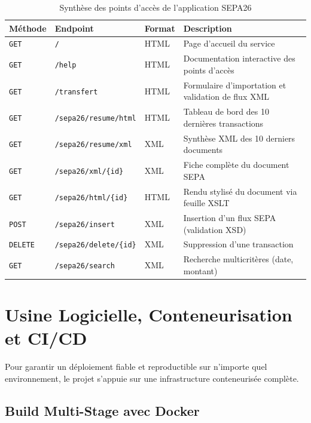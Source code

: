 \documentclass[12pt,a4paper]{article}
\begin{document}
\begin{table}[h]
    \centering
    \small
    \renewcommand{\arraystretch}{1.25}
    \begin{tabularx}{\textwidth}{|l|l|l|X|}
        \hline
        \rowcolor{gray!20} \textbf{Méthode} & \textbf{Endpoint} & \textbf{Format} & \textbf{Description} \\
        \hline
        \texttt{GET} & \texttt{/} & HTML & Page d'accueil du service \\
        \hline
        \texttt{GET} & \texttt{/help} & HTML & Documentation interactive des points d'accès \\
        \hline
        \texttt{GET} & \texttt{/transfert} & HTML & Formulaire d'importation et validation de flux XML \\
        \hline
        \texttt{GET} & \texttt{/sepa26/resume/html} & HTML & Tableau de bord des 10 dernières transactions \\
        \hline
        \texttt{GET} & \texttt{/sepa26/resume/xml} & XML & Synthèse XML des 10 derniers documents \\
        \hline
        \texttt{GET} & \texttt{/sepa26/xml/\{id\}} & XML & Fiche complète du document SEPA \\
        \hline
        \texttt{GET} & \texttt{/sepa26/html/\{id\}} & HTML & Rendu stylisé du document via feuille XSLT \\
        \hline
        \texttt{POST} & \texttt{/sepa26/insert} & XML & Insertion d'un flux SEPA (validation XSD) \\
        \hline
        \texttt{DELETE} & \texttt{/sepa26/delete/\{id\}} & XML & Suppression d'une transaction \\
        \hline
        \texttt{GET} & \texttt{/sepa26/search} & XML & Recherche multicritères (date, montant) \\
        \hline
    \end{tabularx}
    \caption{Synthèse des points d'accès de l'application SEPA26}
\end{table}

\section{Usine Logicielle, Conteneurisation et CI/CD}

Pour garantir un déploiement fiable et reproductible sur n'importe quel environnement, le projet s'appuie sur une infrastructure conteneurisée complète.

\subsection{Build Multi-Stage avec Docker}
\end{document}
